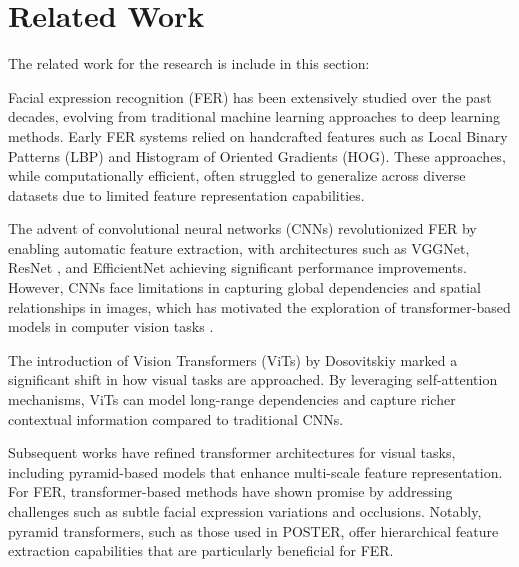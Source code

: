 \section{Related Work}
The related work for the research is include in this section:

Facial expression recognition (FER) has been extensively studied over the past decades, evolving from traditional machine learning approaches to deep learning methods. Early FER systems relied on handcrafted features such as Local Binary Patterns (LBP) and Histogram of Oriented Gradients (HOG). These approaches, while computationally efficient, often struggled to generalize across diverse datasets due to limited feature representation capabilities. 

The advent of convolutional neural networks (CNNs) revolutionized FER by enabling automatic feature extraction, with architectures such as VGGNet, ResNet \cite{he_deep_2015}, and EfficientNet achieving significant performance improvements. However, CNNs face limitations in capturing global dependencies and spatial relationships in images, which has motivated the exploration of transformer-based models in computer vision tasks \cite{islam_recent_2023}.

The introduction of Vision Transformers (ViTs) by Dosovitskiy \cite{dosovitskiy_image_2021} marked a significant shift in how visual tasks are approached. By leveraging self-attention mechanisms, ViTs can model long-range dependencies and capture richer contextual information compared to traditional CNNs.

Subsequent works have refined transformer architectures for visual tasks, including pyramid-based models that enhance multi-scale feature representation\cite{zheng_poster_2022}. For FER, transformer-based methods have shown promise by addressing challenges such as subtle facial expression variations and occlusions. Notably, pyramid transformers, such as those used in POSTER, offer hierarchical feature extraction capabilities that are particularly beneficial for FER.



